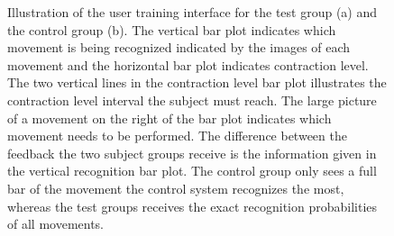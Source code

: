 \begin{figure}[H] 
\centering
	\caption{Illustration of the user training interface for the test group (a) and the control group (b). The vertical bar plot indicates which movement is being recognized indicated by the images of each movement and the horizontal bar plot indicates contraction level. The two vertical lines in the contraction level bar plot illustrates the contraction level interval the subject must reach. The large picture of a movement on the right of the bar plot indicates which movement needs to be performed. The difference between the feedback the two subject groups receive is the information given in the vertical recognition bar plot. The control group only sees a full bar of the movement the control system recognizes the most, whereas the test groups receives the exact recognition probabilities of all movements.}
    \label{fig:feedbackGUI}
\end{figure}

